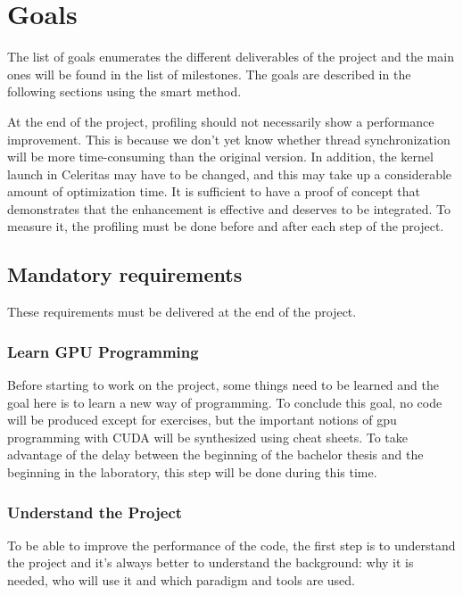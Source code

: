 \chapter{Goals}
\label{spec:ch:goals}

The list of goals enumerates the different deliverables of the project and the main ones will be found in the list of milestones.
The goals are described in the following sections using the \acrshort{smart} method.

At the end of the project, profiling should not necessarily show a performance improvement.
This is because we don't yet know whether thread synchronization will be more time-consuming than the original version.
In addition, the kernel launch in Celeritas may have to be changed, and this may take up a considerable amount of optimization time.
It is sufficient to have a proof of concept that demonstrates that the enhancement is effective and deserves to be integrated.
To measure it, the profiling must be done before and after each step of the project.

\section{Mandatory requirements}
\label{spec:ch:goals:mandatory-requirements}

These requirements must be delivered at the end of the project.


\subsection{Learn GPU Programming}
\label{spec:ch:goals:mandatory-requirements:learn-gpu-programming}

Before starting to work on the project, some things need to be learned and the goal here is to learn a new way of programming.
To conclude this goal, no code will be produced except for exercises, but the important notions of \acrshort{gpu} programming with CUDA will be synthesized using cheat sheets.
To take advantage of the delay between the beginning of the bachelor thesis and the beginning in the laboratory, this step will be done during this time.


\subsection{Understand the Project}
\label{spec:ch:goals:mandatory-requirements:understand-the-project}

To be able to improve the performance of the code, the first step is to understand the project and it's always better to understand the background: why it is needed, who will use it and which paradigm and tools are used.

